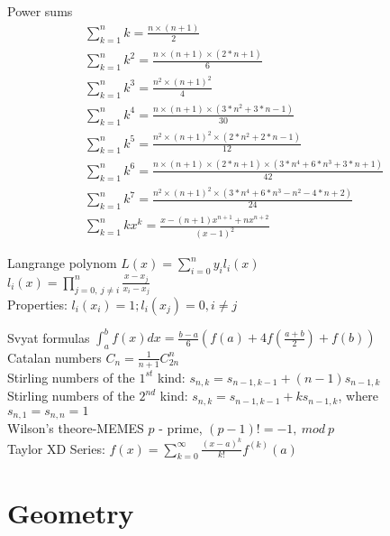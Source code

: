 \documentclass[landscape, 10pt, a4paper, oneside, twocolumn]{extarticle}
\begin{document}
\Formula
{Power sums}
{
    \begin{gather}
        \sum_{k=1}^{n} k = \frac{n \times (n + 1)}{2} \\
        \sum_{k=1}^{n} k^{2} = \frac{n \times (n + 1) \times (2 * n + 1)}{6} \\
        \sum_{k=1}^{n} k^{3} = \frac{n^{2} \times (n + 1)^2}{4} \\
        \sum_{k=1}^{n} k^{4} = \frac{n \times (n + 1) \times (3 * n^{2} + 3 * n - 1)}{30} \\
        \sum_{k=1}^{n} k^{5} = \frac{n^{2} \times (n + 1)^{2} \times (2 * n^{2} + 2 * n - 1)}{12} \\
        \sum_{k=1}^{n} k^{6} = \frac{n \times (n + 1) \times (2 * n + 1) \times (3 * n^{4} + 6 * n^{3} + 3 * n + 1)}{42} \\
        \sum_{k=1}^{n} k^{7} = \frac{n^{2} \times (n + 1)^{2} \times (3 * n^{4} + 6 * n^{3} - n^{2} - 4 * n + 2)}{24} \\
        \sum_{k=1}^{n} k x^{k} = \frac{x - (n + 1) x^{n + 1} + n x^{n + 2}}{(x - 1)^{2}}
    \end{gather}
}

\Formula
{Langrange polynom}
{
    $L(x) = \sum_{i=0}^{n} y_{i} l_{i} (x)$ \\
    $l_{i} (x) = \prod_{j=0,\ j \neq i}^{n} \frac{x - x_{j}}{x_{i} - x_{j}}$ \\
    Properties: $l_{i} (x_{i}) = 1; l_{i} (x_{j}) = 0, i \neq j$
}

\Formula
{Svyat formulas}
{
    $\int_{a}^{b} f(x) dx = \frac{b - a}{6} (f(a) + 4 f(\frac{a + b}{2}) + f(b)) $ \\
    Catalan numbers $C_{n} = \frac{1}{n+1} C_{2n}^{n} $ \\
    Stirling numbers of the $1^{st}$ kind: $s_{n, k} = s_{n - 1, k - 1} + (n - 1) s_{n - 1, k}$ \\
    Stirling numbers of the $2^{nd}$ kind: $s_{n, k} = s_{n - 1, k - 1} + k s_{n - 1, k}$, where $s_{n, 1} = s_{n, n} = 1$ \\
    Wilson's theore-MEMES $p$ - prime, $(p - 1)! = - 1,\ mod\ p$ \\
    Taylor XD Series: $f(x) = \sum_{k=0}^{\infty} \frac{(x - a)^{k}}{k!} f^{(k)}(a)$ 
}




\section{Geometry}
\end{document}
